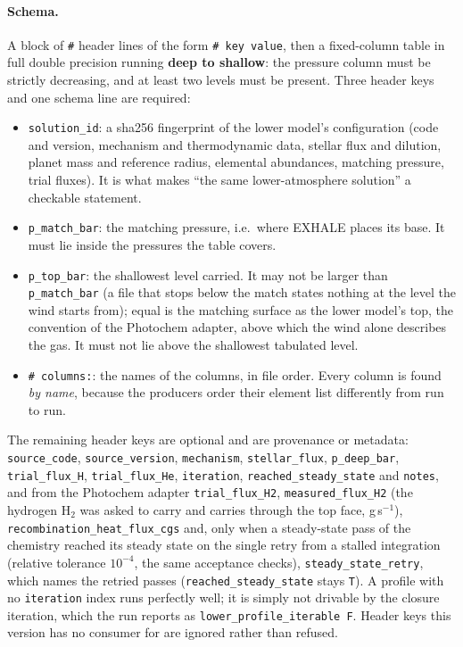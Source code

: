 \documentclass[english,a4paper]{my_memo}
\begin{document}
\paragraph{Schema.} A block of \texttt{\#} header lines of the form
\texttt{\# key value}, then a fixed-column table in full double precision
running \textbf{deep to shallow}: the pressure column must be strictly
decreasing, and at least two levels must be present. Three header keys and one
schema line are required:
\begin{itemize}
\item \texttt{solution\_id}: a sha256 fingerprint of the lower model's
  configuration (code and version, mechanism and thermodynamic data, stellar
  flux and dilution, planet mass and reference radius, elemental abundances,
  matching pressure, trial fluxes). It is what makes ``the same
  lower-atmosphere solution'' a checkable statement.
\item \texttt{p\_match\_bar}: the matching pressure, i.e.\ where EXHALE
  places its base. It must lie inside the pressures the table covers.
\item \texttt{p\_top\_bar}: the shallowest level carried. It may not be
  larger than \texttt{p\_match\_bar} (a file that stops below the match
  states nothing at the level the wind starts from); equal is the matching
  surface as the lower model's top, the convention of the Photochem adapter,
  above which the wind alone describes the gas. It must not lie above the
  shallowest tabulated level.
\item \texttt{\# columns:}: the names of the columns, in file order. Every
  column is found \emph{by name}, because the producers order their element
  list differently from run to run.
\end{itemize}
The remaining header keys are optional and are provenance or metadata:
\texttt{source\_code}, \texttt{source\_version}, \texttt{mechanism},
\texttt{stellar\_flux}, \texttt{p\_deep\_bar}, \texttt{trial\_flux\_H},
\texttt{trial\_flux\_He}, \texttt{iteration}, \texttt{reached\_steady\_state}
and \texttt{notes}, and from the Photochem adapter \texttt{trial\_flux\_H2},
\texttt{measured\_flux\_H2} (the hydrogen H$_2$ was asked to carry and
carries through the top face, g\,s$^{-1}$),
\texttt{recombination\_heat\_flux\_cgs} and, only when a steady-state pass
of the chemistry reached its steady state on the single retry from a stalled
integration (relative tolerance $10^{-4}$, the same acceptance checks),
\texttt{steady\_state\_retry}, which names the retried passes
(\texttt{reached\_steady\_state} stays \texttt{T}). A profile with no \texttt{iteration} index runs perfectly
well; it is simply not drivable by the closure iteration, which the run reports
as \texttt{lower\_profile\_iterable F}. Header keys this version has no
consumer for are ignored rather than refused.
\end{document}
